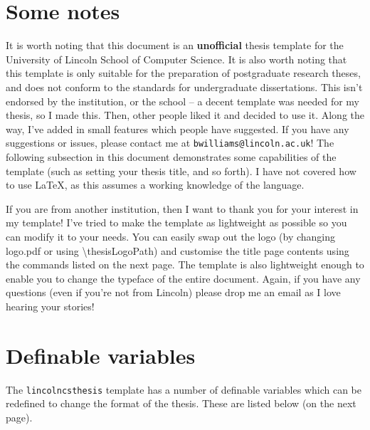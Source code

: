 \section{Some notes}
It is worth noting that this document is an \textbf{unofficial} thesis template for the University of Lincoln School of Computer Science. It is also worth noting that this template is only suitable for the preparation of postgraduate research theses, and does not conform to the standards for undergraduate dissertations. This isn't endorsed by the institution, or the school -- a decent template was needed for my thesis, so I made this. Then, other people liked it and decided to use it. Along the way, I've added in small features which people have suggested. If you have any suggestions or issues, please contact me at \texttt{bwilliams@lincoln.ac.uk}! The following subsection in this document demonstrates some capabilities of the template (such as setting your thesis title, and so forth). I have not covered how to use \LaTeX, as this assumes a working knowledge of the language.

If you are from another institution, then I want to thank you for your interest in my template! I've tried to make the template as lightweight as possible so you can modify it to your needs. You can easily swap out the logo (by changing logo.pdf or using \textbackslash thesisLogoPath) and customise the title page contents using the commands listed on the next page. The template is also lightweight enough to enable you to change the typeface of the entire document. Again, if you have any questions (even if you're not from Lincoln) please drop me an email as I love hearing your stories!

\section{Definable variables}
The \texttt{lincolncsthesis} template has a number of definable variables which can be redefined to change the format of the thesis. These are listed below (on the next page).

